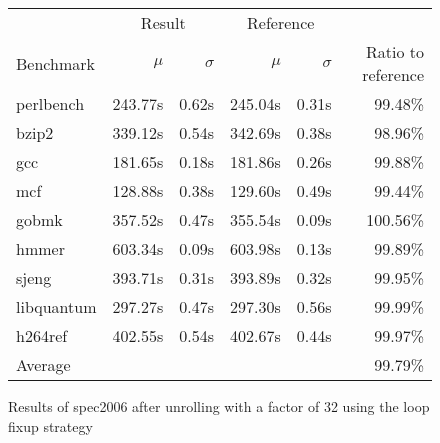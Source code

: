 \begin{figure}[h]
    \begin{center}
        \begin{tabular}{lrrrrr}
            \toprule
            & \multicolumn{2}{c}{Result} & \multicolumn{2}{c}{Reference}\\
            Benchmark & $\mu$ & $\sigma$ & $\mu$ & $\sigma$ & Ratio to reference\\
            \midrule
            perlbench & 243.77s & 0.62s & 245.04s & 0.31s & 99.48\%\\
            bzip2 & 339.12s & 0.54s & 342.69s & 0.38s & 98.96\%\\
            gcc & 181.65s & 0.18s & 181.86s & 0.26s & 99.88\%\\
            mcf & 128.88s & 0.38s & 129.60s & 0.49s & 99.44\%\\
            gobmk & 357.52s & 0.47s & 355.54s & 0.09s & 100.56\%\\
            hmmer & 603.34s & 0.09s & 603.98s & 0.13s & 99.89\%\\
            sjeng & 393.71s & 0.31s & 393.89s & 0.32s & 99.95\%\\
            libquantum & 297.27s & 0.47s & 297.30s & 0.56s & 99.99\%\\
            h264ref & 402.55s & 0.54s & 402.67s & 0.44s & 99.97\%\\
            \midrule
            Average & & & & & 99.79\%\\
            \bottomrule
        \end{tabular}
    \end{center}
    \caption{Results of spec2006 after unrolling with a factor of 32 using the loop fixup strategy}
    \label{fig:eval:perf:loop:32}
\end{figure}
